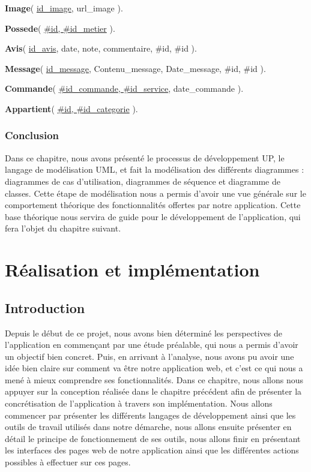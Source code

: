 \documentclass[french]{report}
\begin{document}
           \textbf{Image}( \underline{id\_image}, url\_image ).
           
           \textbf{Possede}( \underline{\#id, \#id\_metier} ).
           
           \textbf{Avis}( \underline{id\_avis}, date, note, commentaire, \#id, \#id ).
           
           \textbf{Message}( \underline{id\_message}, Contenu\_message, Date\_message, \#id, \#id ).
           
           \textbf{Commande}( \underline{\#id\_commande, \#id\_service}, date\_commande ).
           
           \textbf{Appartient}( \underline{\#id, \#id\_categorie} ).
        
        \subsection{Conclusion}
        Dans ce chapitre, nous avons présenté le processus de développement UP,
	le langage de modélisation UML, et fait la modélisation des
	différents diagrammes : diagrammes de cas d'utilisation, diagrammes de séquence 
	et diagramme de classes. Cette étape de modélisation nous a permis d'avoir une 
	vue générale sur le comportement théorique des fonctionnalités offertes par notre
	application. Cette base théorique nous servira de guide pour le développement de 
	l'application, qui fera l'objet du chapitre suivant.


\chapter{Réalisation et implémentation}

    \section{Introduction}
    Depuis le début de ce projet, nous avons bien déterminé les perspectives de l'application 
    en commençant par une étude préalable, qui nous a permis d'avoir un objectif bien concret.
    Puis, en arrivant à l'analyse, nous avons pu avoir une idée bien claire sur comment va
    être notre application web, et c'est ce qui nous a mené à mieux comprendre ses fonctionnalités.
    Dans ce chapitre, nous allons nous appuyer sur la conception réalisée dans le chapitre 
    précédent afin de présenter la concrétisation de l'application à travers son implémentation.
    Nous allons commencer par présenter les différents langages de développement ainsi
    que les outils de travail utilisés dans notre démarche, nous allons ensuite présenter
    en détail le principe de fonctionnement de ses outils, nous allons finir en présentant 
    les interfaces des pages web de notre application ainsi que les différentes actions possibles à effectuer sur ces pages.
    
\end{document}
